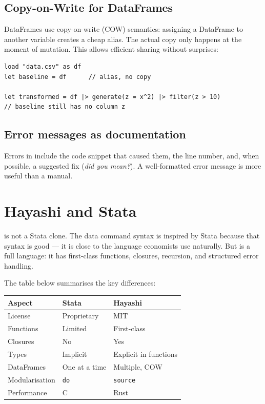 \subsection*{Copy-on-Write for DataFrames}

DataFrames use copy-on-write (COW) semantics: assigning a DataFrame to
another variable creates a cheap alias. The actual copy only happens at
the moment of mutation. This allows efficient sharing without surprises:

\begin{lstlisting}[caption={COW in action}]
load "data.csv" as df
let baseline = df      // alias, no copy

let transformed = df |> generate(z = x^2) |> filter(z > 10)
// baseline still has no column z
\end{lstlisting}

\subsection*{Error messages as documentation}

Errors in \hayashi{} include the code snippet that caused them, the line
number, and, when possible, a suggested fix (\textit{did you mean?}).
A well-formatted error message is more useful than a manual.

\section{Hayashi and Stata}

\hayashi{} is not a Stata clone. The data command syntax is inspired by
Stata because that syntax is good — it is close to the language economists
use naturally. But \hayashi{} is a full language: it has first-class
functions, closures, recursion, and structured error handling.

The table below summarises the key differences:

\begin{center}
\begin{tabular}{lll}
\toprule
\textbf{Aspect} & \textbf{Stata} & \textbf{Hayashi} \\
\midrule
License         & Proprietary      & MIT \\
Functions       & Limited          & First-class \\
Closures        & No               & Yes \\
Types           & Implicit         & Explicit in functions \\
DataFrames      & One at a time    & Multiple, COW \\
Modularisation  & \texttt{do}      & \lstinline{source} \\
Performance     & C                & Rust \\
\bottomrule
\end{tabular}
\end{center}

